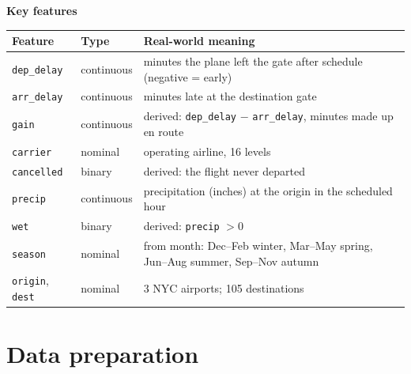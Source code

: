 \documentclass[10pt,a4paper,twocolumn]{article}
\newcommand{\minihead}[1]{\par\needspace{8\baselineskip}\smallskip\textbf{#1}\par}
\newcommand{\code}[1]{\texttt{#1}}
\begin{document}
\minihead{Key features}
{\footnotesize
\begin{tabularx}{\linewidth}{@{}L{2.2cm} L{1.5cm} Y@{}}
\toprule
\textbf{Feature} & \textbf{Type} & \textbf{Real-world meaning} \\
\midrule
\code{dep\_delay} & continuous & minutes the plane left the gate after schedule (negative = early) \\
\code{arr\_delay} & continuous & minutes late at the destination gate \\
\code{gain} & continuous & derived: \code{dep\_delay} $-$ \code{arr\_delay}, minutes made up en route \\
\code{carrier} & nominal & operating airline, 16 levels \\
\code{cancelled} & binary & derived: the flight never departed \\
\code{precip} & continuous & precipitation (inches) at the origin in the scheduled hour \\
\code{wet} & binary & derived: \code{precip} $>0$ \\
\code{season} & nominal & from month: Dec--Feb winter, Mar--May spring, Jun--Aug summer, Sep--Nov autumn \\
\code{origin}, \code{dest} & nominal & 3 NYC airports; 105 destinations \\
\bottomrule
\end{tabularx}}

\section{Data preparation}
\end{document}
